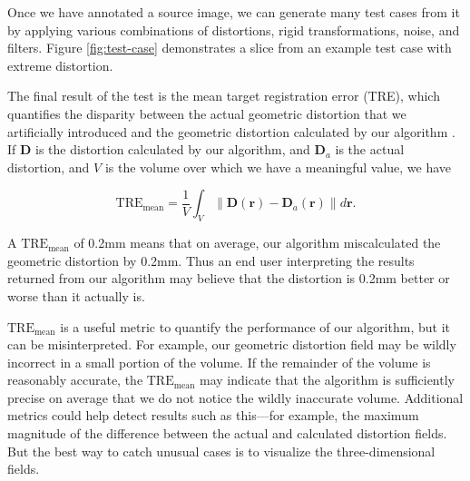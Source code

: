 \documentclass[12pt]{article}
\begin{document}
Once we have annotated a source image, we can generate many test cases from it by applying various combinations of distortions, rigid transformations, noise, and filters.  Figure \ref{fig:test-case} demonstrates a slice from an example test case with extreme distortion.

The final result of the test is the mean target registration error (TRE), which quantifies the disparity between the actual geometric distortion that we artificially introduced and the geometric distortion calculated by our algorithm \cite[page R37]{hill2001}.  If $\textbf{D}$ is the distortion calculated by our algorithm, and $\textbf{D}_a$ is the actual distortion, and $V$ is the volume over which we have a meaningful value, we have

\begin{equation*}
\textrm{TRE}_\textrm{mean} = \frac{1}{V}\int_V \| \textbf{D}(\textbf{r}) - \textbf{D}_a(\textbf{r}) \| d\textbf{r}.
\end{equation*}

A $\textrm{TRE}_\textrm{mean}$ of 0.2mm means that on average, our algorithm miscalculated the geometric distortion by 0.2mm.  Thus an end user interpreting the results returned from our algorithm may believe that the distortion is 0.2mm better or worse than it actually is.

$\textrm{TRE}_\textrm{mean}$ is a useful metric to quantify the performance of our algorithm, but it can be misinterpreted.  For example, our geometric distortion field may be wildly incorrect in a small portion of the volume.  If the remainder of the volume is reasonably accurate, the $\textrm{TRE}_\textrm{mean}$ may indicate that the algorithm is sufficiently precise on average that we do not notice the wildly inaccurate volume.  Additional metrics could help detect results such as this---for example, the maximum magnitude of the difference between the actual and calculated distortion fields.  But the best way to catch unusual cases is to visualize the three-dimensional fields.
\end{document}
